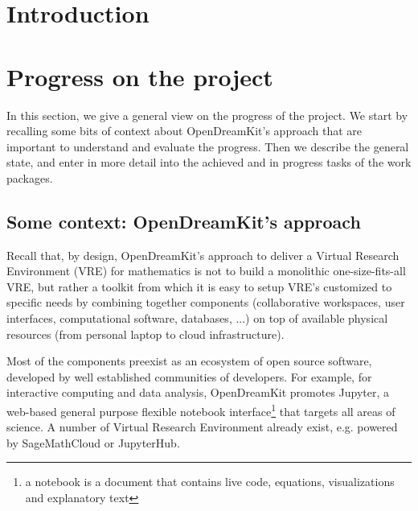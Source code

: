 \documentclass{deliverablereport}
\author{Nicolas Thiéry \& Benoît Pilorget}
\begin{document}
\maketitle
\githubissuedescription
\newpage

\newcommand{\ODK}{OpenDreamKit\xspace}
\tableofcontents\newpage

\section{Introduction}




\section{Progress on the project}

In this section, we give a general view on the progress of the
project. We start by recalling some bits of context about \ODK's
approach that are important to understand and evaluate the
progress. Then we describe the general state, and enter in more detail
into the achieved and in progress tasks of the work packages.

\subsection{Some context: \ODK's approach}

Recall that, by design, \ODK's approach to deliver a Virtual Research
Environment (VRE) for mathematics is not to build a monolithic
one-size-fits-all VRE, but rather a toolkit from which it is easy to
setup VRE's customized to specific needs by combining together
components (collaborative workspaces, user interfaces, computational
software, databases, ...) on top of available physical resources (from
personal laptop to cloud infrastructure).

Most of the components preexist as an ecosystem of open source
software, developed by well established communities of developers. For
example, for interactive computing and data analysis, OpenDreamKit
promotes Jupyter, a web-based general purpose flexible notebook
interface\footnote{a notebook is a document that contains live code,
  equations, visualizations and explanatory text} that targets all
areas of science. A number of Virtual Research Environment already
exist, e.g. powered by SageMathCloud or JupyterHub.
\end{document}
